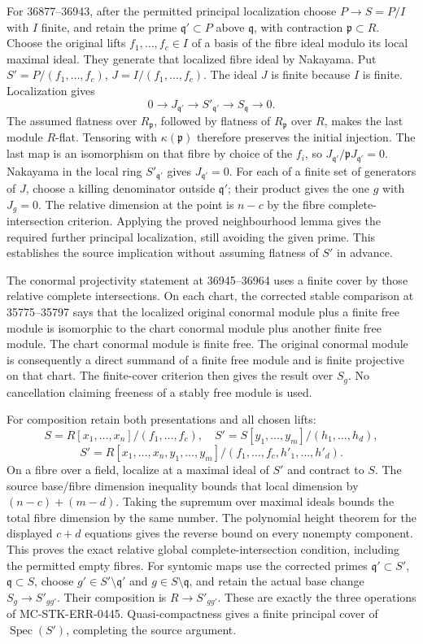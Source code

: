 For 36877--36943, after the permitted principal localization choose \(P\to S=P/I\) with \(I\) finite, and retain the prime \(\mathfrak q'\subset P\) above \(\mathfrak q\), with contraction \(\mathfrak p\subset R\). Choose the original lifts \(f_1,\ldots,f_c\in I\) of a basis of the fibre ideal modulo its local maximal ideal. They generate that localized fibre ideal by Nakayama. Put \(S'=P/(f_1,\ldots,f_c)\), \(J=I/(f_1,\ldots,f_c)\). The ideal \(J\) is finite because \(I\) is finite. Localization gives \[
0\to J_{\mathfrak q'}\to S'_{\mathfrak q'}\to S_{\mathfrak q}\to0.
\] The assumed flatness over \(R_{\mathfrak p}\), followed by flatness of \(R_{\mathfrak p}\) over \(R\), makes the last module \(R\)-flat. Tensoring with \(\kappa(\mathfrak p)\) therefore preserves the initial injection. The last map is an isomorphism on that fibre by choice of the \(f_i\), so \(J_{\mathfrak q'}/\mathfrak pJ_{\mathfrak q'}=0\). Nakayama in the local ring \(S'_{\mathfrak q'}\) gives \(J_{\mathfrak q'}=0\). For each of a finite set of generators of \(J\), choose a killing denominator outside \(\mathfrak q'\); their product gives the one \(g\) with \(J_g=0\). The relative dimension at the point is \(n-c\) by the fibre complete-intersection criterion. Applying the proved neighbourhood lemma gives the required further principal localization, still avoiding the given prime. This establishes the source implication without assuming flatness of \(S'\) in advance.

The conormal projectivity statement at 36945--36964 uses a finite cover by those relative complete intersections. On each chart, the corrected stable comparison at 35775--35797 says that the localized original conormal module plus a finite free module is isomorphic to the chart conormal module plus another finite free module. The chart conormal module is finite free. The original conormal module is consequently a direct summand of a finite free module and is finite projective on that chart. The finite-cover criterion then gives the result over \(S_g\). No cancellation claiming freeness of a stably free module is used.

For composition retain both presentations and all chosen lifts: \[
S=R[x_1,\ldots,x_n]/(f_1,\ldots,f_c),\quad
S'=S[y_1,\ldots,y_m]/(h_1,\ldots,h_d),
\] \[
S'=R[x_1,\ldots,x_n,y_1,\ldots,y_m]/(f_1,\ldots,f_c,h'_1,\ldots,h'_d).
\] On a fibre over a field, localize at a maximal ideal of \(S'\) and contract to \(S\). The source base/fibre dimension inequality bounds that local dimension by \((n-c)+(m-d)\). Taking the supremum over maximal ideals bounds the total fibre dimension by the same number. The polynomial height theorem for the displayed \(c+d\) equations gives the reverse bound on every nonempty component. This proves the exact relative global complete-intersection condition, including the permitted empty fibres. For syntomic maps use the corrected primes \(\mathfrak q'\subset S'\), \(\mathfrak q\subset S\), choose \(g'\in S'\setminus\mathfrak q'\) and \(g\in S\setminus\mathfrak q\), and retain the actual base change \(S_g\to S'_{gg'}\). Their composition is \(R\to S'_{gg'}\). These are exactly the three operations of MC-STK-ERR-0445. Quasi-compactness gives a finite principal cover of \(\operatorname{Spec}(S')\), completing the source argument.

